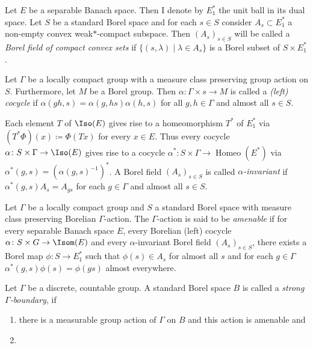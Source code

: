 \begin{defin}
  Let \(E\) be a separable Banach space. Then I denote by \(E^\ast_1\) the unit ball in its dual space. Let \(S\) be a standard Borel space and for each \(s \in S\) consider \(A_s \subset E^\ast_1\) a non-empty convex weak\(\ast\)-compact subspace. Then \((A_s)_{s \in S}\) will be called a \emph{Borel field of compact convex sets} if \(\{(s, \lambda) \mid \lambda \in A_s\}\) is a Borel subset of \(S \times E^\ast_1\).

  Let \(\Gamma\) be a locally compact group with a measure class preserving group action on \(S\). Furthermore, let \(M\) be a Borel group. Then \(\alpha \colon \Gamma \times s \to M\) is called a \emph{(left) cocycle} if \(\alpha(gh, s) = \alpha(g, hs) \alpha(h, s)\) for all \(g, h \in \Gamma\) and almost all \(s \in S\).

  Each element \(T\) of \(\Iso(E)\) gives rise to a homeomorphism \(T^\ast\) of \(E^\ast_1\) via \((T^\ast\Phi)(x) \coloneqq \Phi(Tx)\) for every \(x \in E\). Thus every cocycle \(\alpha \colon S \times \Gamma \to \Iso(E)\) gives rise to a cocycle \(\alpha^\ast \colon S \times \Gamma \to \operatorname{Homeo}(E^\ast)\) via \(\alpha^\ast (g, s) = (\alpha(g, s)^{-1})^\ast\). A Borel field \((A_s)_{s \in S}\) is called \emph{\(\alpha\)-invariant} if \(\alpha^\ast(g, s) A_{s} = A_{gs}\) for each \(g \in \Gamma\) and almost all \(s \in S\).
  
  Let \(\Gamma\) be a locally compact group and \(S\) a standard Borel space with measure class preserving Borelian \(\Gamma\)-action. The \(\Gamma\)-action is said to be \emph{amenable} if for every separable Banach space \(E\), every Borelian (left) cocycle \(\alpha \colon S \times G \to \Isom(E)\) and every \(\alpha\)-invariant Borel field \((A_s)_{s \in S}\), there exists a Borel map \(\phi \colon S \to E^\ast_1\) such that \(\phi(s) \in A_s\) for almost all \(s\) and for each \(g \in \Gamma\)\(\alpha^\ast(g, s) \phi(s) = \phi(gs)\) almost everywhere.
\end{defin}

\begin{defin}
  Let \(\Gamma\) be a discrete, countable group. A standard Borel space \(B\) is called a \emph{strong \(\Gamma\)-boundary}, if
  \begin{enumerate}
  \item there is a measurable group action of \(\Gamma\) on \(B\) and this action is amenable and
  \item 
  \end{enumerate}
\end{defin}

